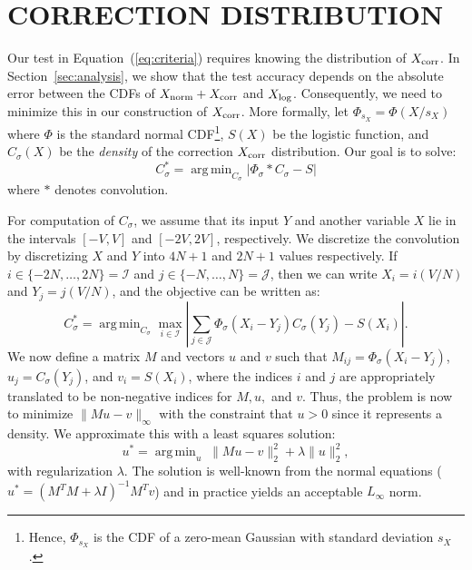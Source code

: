 \documentclass[twoside]{article} \usepackage{aistats2017}
\DeclareMathOperator*{\argmin}{arg\,min}
\begin{document}
\section{CORRECTION DISTRIBUTION}\label{sec:correction}

Our test in Equation~(\ref{eq:criteria}) requires knowing the distribution of
$X_{\rm corr}$. In Section~\ref{sec:analysis}, we show that the test accuracy
depends on the absolute error between the CDFs of $X_{\rm norm} + X_{\rm corr}$
and $X_{\rm log}$. Consequently, we need to minimize this in our construction of
$X_{\rm corr}$. More formally, let $\Phi_{s_X} = \Phi(X/s_X)$ where $\Phi$ is
the standard normal CDF\footnote{Hence, $\Phi_{s_X}$ is the CDF of a zero-mean
Gaussian with standard deviation $s_X$.}, $S(X)$ be the logistic function, and
$C_{\sigma}(X)$ be the \emph{density} of the correction $X_{\rm corr}$
distribution. Our goal is to solve:
\begin{equation}\label{eq:overall_corr_problem}
    C_\sigma^* = \argmin_{C_\sigma} |\Phi_{\sigma} * C_{\sigma} - S|
\end{equation}
where $*$ denotes convolution.

For computation of $C_\sigma$, we assume that its input $Y$ and another variable
$X$ lie in the intervals $[-V,V]$ and $[-2V,2V]$, respectively.
We discretize the convolution by discretizing $X$ and $Y$ into $4N+1$ and $2N+1$
values respectively. If $i \in \{-2N, \ldots, 2N\}=\mathcal{I}$ and $j \in \{-N,
\ldots, N\}=\mathcal{J}$, then we can write $X_i = i(V/N)$ and $Y_j = j(V/N)$, and the
objective can be written as:
\[
C_\sigma^* = \argmin_{C_\sigma} \max_{i \in \mathcal{I}}\left|\sum_{j\in\mathcal{J}} \Phi_{\sigma}(X_i-Y_j) C_{\sigma}(Y_j) - S(X_i)\right|.
\]
We now define a matrix $M$ and vectors $u$ and $v$ such that $M_{ij} =
\Phi_{\sigma}(X_i-Y_j)$, $u_j = C_{\sigma}(Y_j)$, and $v_i = S(X_i)$, where the
indices $i$ and $j$ are appropriately translated to be non-negative indices for
$M, u,$ and $v$. Thus, the problem is now to minimize $\|Mu-v\|_{\infty}$ with
the constraint that $u > 0$ since it represents a density. We approximate this
with a least squares solution:
\begin{equation}\label{eq:optimization_l2}
    u^* = \argmin_u\; \|Mu-v\|_2^2 + \lambda \|u\|_2^2,
\end{equation}
with regularization $\lambda$. The solution is well-known from the normal
equations ($u^* = (M^TM + \lambda I)^{-1}M^Tv$) and in practice yields an
acceptable $L_{\infty}$ norm.
\end{document}
